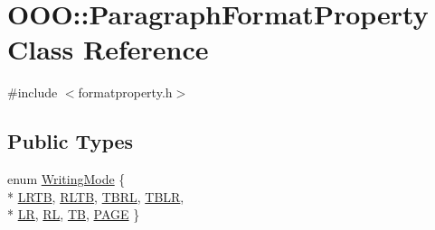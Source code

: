 \hypertarget{classOOO_1_1ParagraphFormatProperty}{\section{O\+O\+O\+:\+:Paragraph\+Format\+Property Class Reference}
\label{classOOO_1_1ParagraphFormatProperty}
}


{\ttfamily \#include $<$formatproperty.\+h$>$}

\subsection*{Public Types}
\begin{DoxyCompactItemize}
\item 
enum \hyperlink{classOOO_1_1ParagraphFormatProperty_ad1278a086adbef8bae4546ffae6f7655}{Writing\+Mode} \{ \\*
\hyperlink{classOOO_1_1ParagraphFormatProperty_ad1278a086adbef8bae4546ffae6f7655a28a9d2937f66eff315178bae679fc97a}{L\+R\+T\+B}, 
\hyperlink{classOOO_1_1ParagraphFormatProperty_ad1278a086adbef8bae4546ffae6f7655a1ef9950c08e4816db669dbb40078590e}{R\+L\+T\+B}, 
\hyperlink{classOOO_1_1ParagraphFormatProperty_ad1278a086adbef8bae4546ffae6f7655a4074d6d3dc6b8642bc413c5d757bf0d5}{T\+B\+R\+L}, 
\hyperlink{classOOO_1_1ParagraphFormatProperty_ad1278a086adbef8bae4546ffae6f7655a0cf4edda775822109c767fe655913fc2}{T\+B\+L\+R}, 
\\*
\hyperlink{classOOO_1_1ParagraphFormatProperty_ad1278a086adbef8bae4546ffae6f7655aebcd449515edf1febf84aef96d500b4f}{L\+R}, 
\hyperlink{classOOO_1_1ParagraphFormatProperty_ad1278a086adbef8bae4546ffae6f7655ac50a602ad38018b98d2dc4b07c1c8203}{R\+L}, 
\hyperlink{classOOO_1_1ParagraphFormatProperty_ad1278a086adbef8bae4546ffae6f7655a2c263609766c66c9aa435a9882f4632f}{T\+B}, 
\hyperlink{classOOO_1_1ParagraphFormatProperty_ad1278a086adbef8bae4546ffae6f7655adf68d5f7bf23cffbdfda50afa6b96885}{P\+A\+G\+E}
 \}
\end{DoxyCompactItemize}
